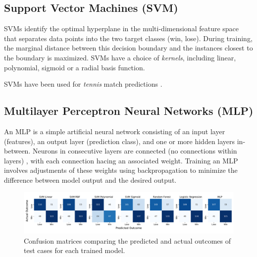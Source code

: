 \subsection{Support Vector Machines (SVM)}
SVMs identify the optimal hyperplane in the multi-dimensional feature space that separates data points into the two target classes (win, lose). During training, the marginal distance between this decision boundary and the instances closest to the boundary is maximized. %
SVMs have a choice of \textit{kernels}, including linear, polynomial, sigmoid or a radial basis function.

SVMs have been used for  \textit{tennis} match predictions \cite{cornman2017machine}.

\subsection{Multilayer Perceptron Neural Networks (MLP)}
An MLP is a simple artificial neural network consisting of an input layer (features), an output layer (prediction class), and  one or more hidden layers in-between. Neurons in consecutive layers are connected (no connections within layers) \cite{noriega2005multilayer}, with each connection hacing an associated weight. Training an MLP involves adjustments of these weights using backpropagation to minimize the difference between model output and the desired output.

\begin{figure}[h]
\centering
\includegraphics[width=18cm]{plots/confusionmatrices.pdf}
\vspace{-1em}
\caption{Confusion matrices comparing the predicted and actual outcomes of test cases for each trained model.}

\label{fig:confusionmatrices}
\centering
\end{figure}